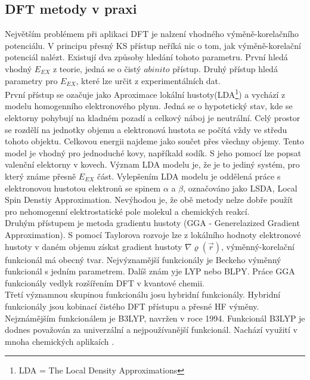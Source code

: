 \documentclass[
  digital, %
  table,   %
  lof,     %
  lot,     %
  oneside,
]{fithesis3}
\begin{document}
\subsection{DFT metody v praxi}
Největším problémem při aplikaci DFT je nalzení vhodného výměně-korelačního potenciálu. V principu přesný KS přístup neříká nic o tom, jak výměně-korelační potenciál nalézt. Existují dva způsoby hledání tohoto parametru. První hledá vhodný $E_{EX}$ z teorie, jedná se o čistý $ab inito$ přístup. Druhý přístup hledá parametry pro $E_{EX}$, které lze určit z experimentálních dat. \\
První přístup se ozačuje jako Aproximace lokální hustoty(LDA\footnote{LDA = The Local Density Approximations}) a vychází z modelu homogenního elektronového plynu. Jedná se o hypotetický stav, kde se elektorny pohybují na kladném pozadí a celkový náboj je neutrální. Celý prostor se rozdělí na jednotky objemu a elektronová hustota se počítá vždy ve středu tohoto objektu. Celkovou energii najdeme jako součet přes všechny objemy. Tento model je vhodný pro jednoduché kovy, napříkald sodík. S jeho pomocí lze popsat valenční elektorny v kovech. Význam LDA modelu je, že je to jediný systém, pro který známe přesně $E_{EX}$ část. Vylepšením LDA modelu je oddělená práce s elektronovou hustotou elektronů se spinem $\alpha$ a $\beta$, označováno jako LSDA, Local Spin Denstiy Approximation. Nevýhodou je, že obě metody nelze dobře použít pro nehomogenní elektrostatické pole molekul a chemických reakcí.\\
 Druhým přístupem je metoda gradientu hustoty (GGA - Generelazized Gradient Approximation). S pomocí Taylorova rozvoje lze z lokálního hodnoty elektronové hustoty v daném objemu získat gradient hustoty $\nabla \varrho(\vec{r})$, výměnný-korelační funkcionál má obecný tvar. Nejvýznamější funkcionály je Beckeho výměnný funkcionál s jedním parametrem. Dalíš znám yje LYP nebo BLPY. Práce GGA funkcionály vedlyk rozšířením DFT v kvantové chemii. \\
 Třetí významnou skupinou funkcionálu josu hybridní funkcionály. Hybridní funkcionály jsou kobinací čistého DFT přístupu a přesné HF výměny. Nejznámějším funkcionálem je B3LYP, navržen v roce 1994. Funkcionál B3LYP je dodnes považován za univerzální a nejpoužívanější funkcionál. Nachází využití v mnoha chemických aplikaích \cite{koch2000chemist}.
\end{document}
